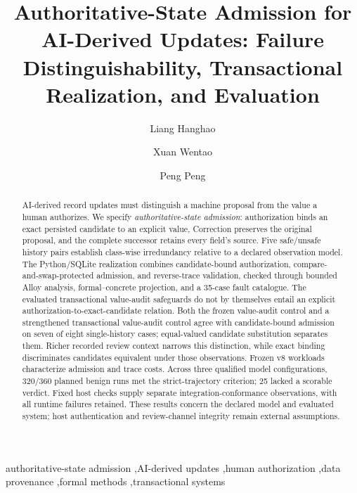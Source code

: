 \documentclass[preprint,12pt,authoryear]{elsarticle}
\begin{document}
\begin{frontmatter}

\title{Authoritative-State Admission for AI-Derived Updates: Failure Distinguishability, Transactional Realization, and Evaluation}

\author[inst1]{Liang Hanghao}
\author[inst1]{Xuan Wentao}
\author[inst1]{Peng Peng}

\begin{abstract}
AI-derived record updates must distinguish a machine proposal from the value a human authorizes. We specify \emph{authoritative-state admission}: authorization binds an exact persisted candidate to an explicit value, Correction preserves the original proposal, and the complete successor retains every field's source. Five safe/unsafe history pairs establish class-wise irredundancy relative to a declared observation model. The Python/SQLite realization combines candidate-bound authorization, compare-and-swap-protected admission, and reverse-trace validation, checked through bounded Alloy analysis, formal--concrete projection, and a 35-case fault catalogue. The evaluated transactional value-audit safeguards do not by themselves entail an explicit authorization-to-exact-candidate relation. Both the frozen value-audit control and a strengthened transactional value-audit control agree with candidate-bound admission on seven of eight single-history cases; equal-valued candidate substitution separates them. Richer recorded review context narrows this distinction, while exact binding discriminates candidates equivalent under those observations. Frozen v8 workloads characterize admission and trace costs. Across three qualified model configurations, 320/360 planned benign runs met the strict-trajectory criterion; 25 lacked a scorable verdict. Fixed host checks supply separate integration-conformance observations, with all runtime failures retained. These results concern the declared model and evaluated system; host authentication and review-channel integrity remain external assumptions.
\end{abstract}

\begin{keyword}
authoritative-state admission \sep AI-derived updates \sep human authorization \sep data provenance \sep formal methods \sep transactional systems
\end{keyword}

\end{frontmatter}
\end{document}
